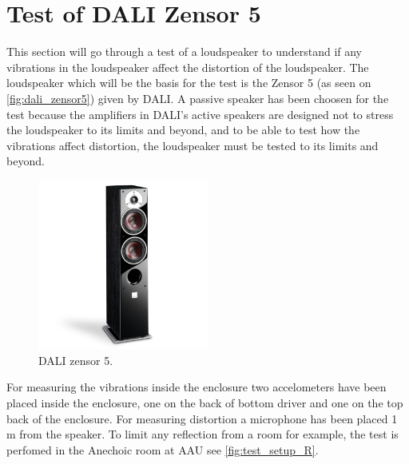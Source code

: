\chapter{Test of DALI Zensor 5}
This section will go through a test of a loudspeaker to understand if any vibrations in the loudspeaker affect the distortion of the loudspeaker.
The loudspeaker which will be the basis for the test is the Zensor 5 (as seen on \autoref{fig:dali_zensor5}) given by DALI. A passive speaker has been choosen for the test because the amplifiers in DALI's active speakers are designed not to stress the loudspeaker to its limits and beyond, and to be able to test how the vibrations affect distortion, the loudspeaker must be tested to its limits and beyond.

\begin{figure}[H]
\centering
\includegraphics[width=0.5\textwidth]{figures/zensor5.png}
\caption{DALI zensor 5.}
\label{fig:dali_zensor5}
\end{figure}


For measuring the vibrations inside the enclosure two accelometers have been placed inside the enclosure, one on the back of bottom driver and one on the top back of the enclosure. For measuring distortion a microphone has been placed 1 m from the speaker. To limit any reflection from a room for example, the test is perfomed in the Anechoic room at \gls{AAU} see \ref{fig:test_setup_R}.   

